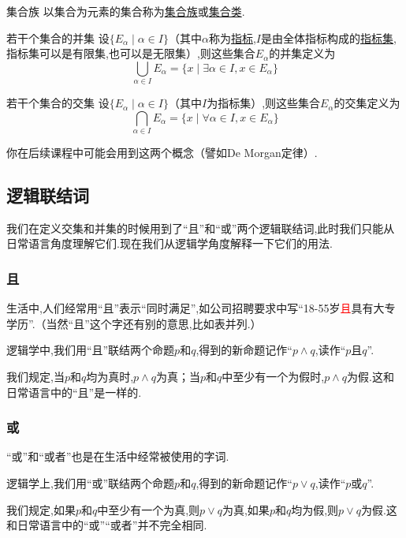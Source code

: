 \documentclass[lang=cn,math=cm,chinesefont=nofont,11pt,scheme=chinese,twocol]{elegantbook}
\begin{document}
\begin{definition}{集合族}
  以集合为元素的集合称为\underline{集合族}或\underline{集合类}.
\end{definition}

\begin{definition}{若干个集合的并集}
  设$\{E_\alpha\mid\alpha\in I\}$（其中$\alpha$称为\underline{指标},$I$是由全体指标构成的\underline{指标集},指标集可以是有限集,也可以是无限集）,则这些集合$E_\alpha$的并集定义为$$\bigcup_{\alpha\in I}E_\alpha=\{x\mid\exists\alpha\in I,x\in E_\alpha\}$$
\end{definition}

\begin{definition}{若干个集合的交集}
  设$\{E_\alpha\mid\alpha\in I\}$（其中$I$为指标集）,则这些集合$E_\alpha$的交集定义为$$\bigcap_{\alpha\in I}E_\alpha=\{x\mid\forall\alpha\in I,x\in E_\alpha\}$$
\end{definition}

你在后续课程中可能会用到这两个概念（譬如De Morgan定律）.

\subsection{逻辑联结词}

我们在定义交集和并集的时候用到了“且”和“或”两个逻辑联结词,此时我们只能从日常语言角度理解它们.现在我们从逻辑学角度解释一下它们的用法.

\subsubsection{且}

生活中,人们经常用“且”表示“同时满足”,如公司招聘要求中写“18-55岁\textcolor{red}{且}具有大专学历”.（当然“且”这个字还有别的意思,比如表并列.）

逻辑学中,我们用“且”联结两个命题$p$和$q$,得到的新命题记作“$p\land q$,读作“$p$且$q$”.

我们规定,当$p$和$q$均为真时,$p\land q$为真；当$p$和$q$中至少有一个为假时,$p\land q$为假.这和日常语言中的“且”是一样的.

\subsubsection{或}

“或”和“或者”也是在生活中经常被使用的字词.

逻辑学上,我们用“或”联结两个命题$p$和$q$,得到的新命题记作“$p\lor q$,读作“$p$或$q$”.

我们规定,如果$p$和$q$中至少有一个为真,则$p\lor q$为真,如果$p$和$q$均为假,则$p\lor q$为假.这和日常语言中的“或”“或者”并不完全相同.
\end{document}

